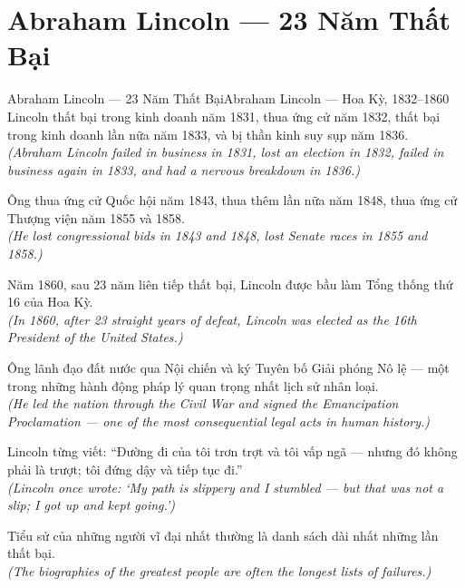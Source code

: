\section{Abraham Lincoln --- 23 Năm Thất Bại}
\begin{truyen}{Abraham Lincoln --- 23 Năm Thất Bại}{Abraham Lincoln --- Hoa Kỳ, 1832--1860}
 Lincoln thất bại trong kinh doanh năm 1831, thua ứng cử năm 1832, thất bại trong kinh doanh lần nữa năm 1833, và bị thần kinh suy sụp năm 1836.\\[4pt]
\textit{(Abraham Lincoln failed in business in 1831, lost an election in 1832, failed in business again in 1833, and had a nervous breakdown in 1836.)}

Ông thua ứng cử Quốc hội năm 1843, thua thêm lần nữa năm 1848, thua ứng cử Thượng viện năm 1855 và 1858.\\[4pt]
\textit{(He lost congressional bids in 1843 and 1848, lost Senate races in 1855 and 1858.)}

Năm 1860, sau 23 năm liên tiếp thất bại, Lincoln được bầu làm Tổng thống thứ 16 của Hoa Kỳ.\\[4pt]
\textit{(In 1860, after 23 straight years of defeat, Lincoln was elected as the 16th President of the United States.)}

Ông lãnh đạo đất nước qua Nội chiến và ký Tuyên bố Giải phóng Nô lệ --- một trong những hành động pháp lý quan trọng nhất lịch sử nhân loại.\\[4pt]
\textit{(He led the nation through the Civil War and signed the Emancipation Proclamation --- one of the most consequential legal acts in human history.)}

Lincoln từng viết: ``Đường đi của tôi trơn trợt và tôi vấp ngã --- nhưng đó không phải là trượt; tôi đứng dậy và tiếp tục đi.''\\[4pt]
\textit{(Lincoln once wrote: `My path is slippery and I stumbled --- but that was not a slip; I got up and kept going.')}

\end{truyen}
\begin{baihoc}
  Tiểu sử của những người vĩ đại nhất thường là danh sách dài nhất những lần thất bại.\\[4pt]
  \textit{(The biographies of the greatest people are often the longest lists of failures.)}
\end{baihoc}

